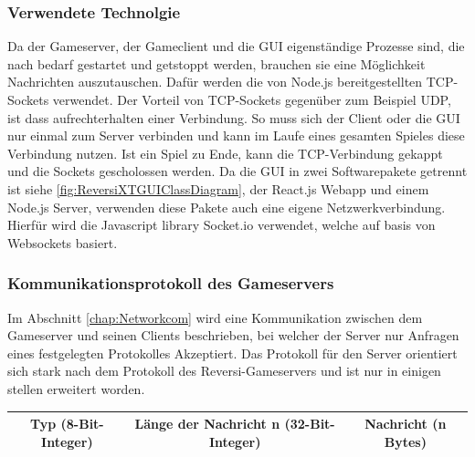 \documentclass[12pt,a4paper,bibliography=totocnumbered,listof=totocnumbered]{article}
\begin{document}
\subsubsection{Verwendete Technolgie}
Da der Gameserver, der Gameclient und die GUI eigenständige Prozesse sind, die nach bedarf gestartet und getstoppt werden, brauchen sie eine 
Möglichkeit Nachrichten auszutauschen. Dafür werden die von Node.js bereitgestellten TCP-Sockets verwendet. Der Vorteil von TCP-Sockets 
gegenüber zum Beispiel UDP, ist dass aufrechterhalten einer Verbindung. So muss sich der Client oder die GUI nur einmal zum Server verbinden 
und kann im Laufe eines gesamten Spieles diese Verbindung nutzen. Ist ein Spiel zu Ende, kann die TCP-Verbindung gekappt und die 
Sockets gescholossen werden. Da die GUI in zwei Softwarepakete getrennt ist siehe \ref{fig:ReversiXTGUIClassDiagram}, der React.js Webapp und einem Node.js Server, verwenden 
diese Pakete auch eine eigene Netzwerkverbindung. Hierfür wird die Javascript library Socket.io verwendet, welche auf basis von Websockets basiert.

\subsubsection{Kommunikationsprotokoll des Gameservers}
Im Abschnitt \ref{chap:Networkcom} wird eine Kommunikation zwischen dem Gameserver und seinen Clients beschrieben, bei welcher der 
Server nur Anfragen eines festgelegten Protokolles Akzeptiert. Das Protokoll für den Server orientiert sich stark nach dem Protokoll
des Reversi-Gameservers und ist nur in einigen stellen erweitert worden.
%
\begin{table}[H]
    \centering
    \begin{tabular} {|c|c|c|}
        \hline
        Typ (8-Bit-Integer) & Länge der Nachricht n (32-Bit-Integer) & Nachricht (n Bytes) \\
        \hline
    \end{tabular}
    \label{fig:Nachritenaufbau}
\end{table}
\end{document}
